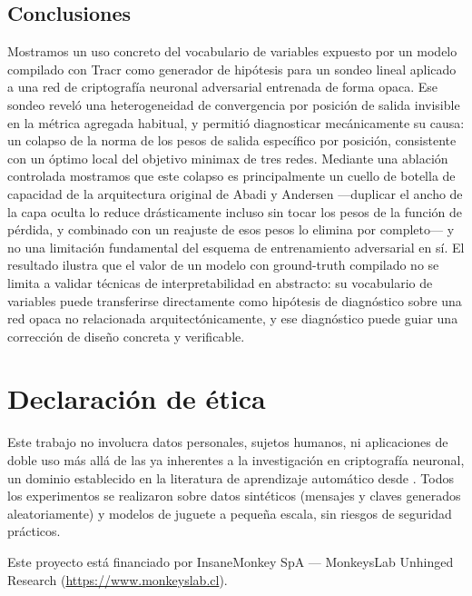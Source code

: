 \documentclass[manuscript,screen]{acmart}
\begin{document}
\subsection{Conclusiones}

Mostramos un uso concreto del vocabulario de variables expuesto por un modelo compilado con
Tracr como generador de hipótesis para un sondeo lineal aplicado a una red de criptografía
neuronal adversarial entrenada de forma opaca. Ese sondeo reveló una heterogeneidad de
convergencia por posición de salida invisible en la métrica agregada habitual, y permitió
diagnosticar mecánicamente su causa: un colapso de la norma de los pesos de salida específico
por posición, consistente con un óptimo local del objetivo minimax de tres redes. Mediante una
ablación controlada mostramos que este colapso es principalmente un cuello de botella de
capacidad de la arquitectura original de Abadi y Andersen —duplicar el ancho de la capa oculta
lo reduce drásticamente incluso sin tocar los pesos de la función de pérdida, y combinado con un
reajuste de esos pesos lo elimina por completo— y no una limitación fundamental del esquema de
entrenamiento adversarial en sí. El resultado ilustra que el valor de un modelo con ground-truth
compilado no se limita a validar técnicas de interpretabilidad en abstracto: su vocabulario de
variables puede transferirse directamente como hipótesis de diagnóstico sobre una red opaca no
relacionada arquitectónicamente, y ese diagnóstico puede guiar una corrección de diseño
concreta y verificable.

\section*{Declaración de ética}

Este trabajo no involucra datos personales, sujetos humanos, ni aplicaciones de doble uso más
allá de las ya inherentes a la investigación en criptografía neuronal, un dominio establecido en
la literatura de aprendizaje automático desde \citet{abadi2016learning}. Todos los experimentos
se realizaron sobre datos sintéticos (mensajes y claves generados aleatoriamente) y modelos de
juguete a pequeña escala, sin riesgos de seguridad prácticos.

\begin{acks}
Este proyecto está financiado por InsaneMonkey SpA --- MonkeysLab Unhinged Research
(\url{https://www.monkeyslab.cl}).
\end{acks}



\end{document}
